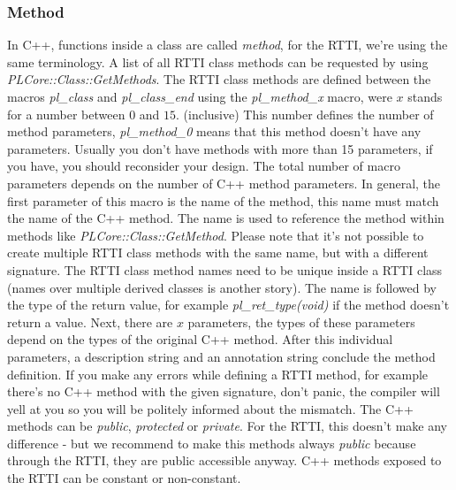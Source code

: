 \subsubsection{Method}
\label{ClassMembers:Method}
In C++, functions inside a class are called \emph{method}, for the RTTI, we're using the same terminology. A list of all RTTI class methods can be requested by using \emph{PLCore::Class::GetMethods}. The RTTI class methods are defined between the macros \emph{pl\_class} and \emph{pl\_class\_end} using the \emph{pl\_method\_x} macro, were $x$ stands for a number between $0$ and $15$. (inclusive) This number defines the number of method parameters, \emph{pl\_method\_0} means that this method doesn't have any parameters. Usually you don't have methods with more than 15 parameters, if you have, you should reconsider your design. The total number of macro parameters depends on the number of C++ method parameters. In general, the first parameter of this macro is the name of the method, this name must match the name of the C++ method. The name is used to reference the method within methods like \emph{PLCore::Class::GetMethod}. Please note that it's not possible to create multiple RTTI class methods with the same name, but with a different signature. The RTTI class method names need to be unique inside a RTTI class (names over multiple derived classes is another story). The name is followed by the type of the return value, for example \emph{pl\_ret\_type(void)} if the method doesn't return a value. Next, there are $x$ parameters, the types of these parameters depend on the types of the original C++ method. After this individual parameters, a description string and an annotation string conclude the method definition. If you make any errors while defining a RTTI method, for example there's no C++ method with the given signature, don't panic, the compiler will yell at you so you will be politely informed about the mismatch. The C++ methods can be \emph{public}, \emph{protected} or \emph{private}. For the RTTI, this doesn't make any difference - but we recommend to make this methods always \emph{public} because through the RTTI, they are public accessible anyway. C++ methods exposed to the RTTI can be constant or non-constant.

